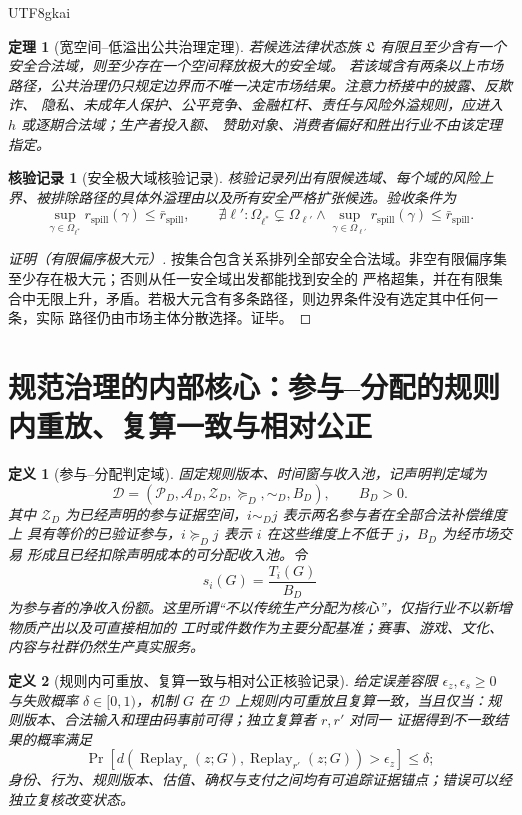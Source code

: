 \documentclass[12pt,a4paper,openany]{report}
\newtheorem{definition}{定义}[chapter]
\newtheorem{theorem}{定理}[chapter]
\newtheorem{Certificate}{核验记录}[chapter]
\newcommand{\Part}{\mathcal P}
\newcommand{\Act}{\mathcal A}
\begin{document}
\begin{CJK*}{UTF8}{gkai}
\begin{theorem}[宽空间--低溢出公共治理定理]
\label{thm:maximal-safe-governance-space}
若候选法律状态族 \(\mathfrak L\) 有限且至少含有一个安全合法域，则至少存在一个空间释放极大的安全域。
若该域含有两条以上市场路径，公共治理仍只规定边界而不唯一决定市场结果。注意力桥接中的披露、反欺诈、
隐私、未成年人保护、公平竞争、金融杠杆、责任与风险外溢规则，应进入 \(h\) 或逐期合法域；生产者投入额、
赞助对象、消费者偏好和胜出行业不由该定理指定。
\end{theorem}

\begin{Certificate}[安全极大域核验记录]
核验记录列出有限候选域、每个域的风险上界、被排除路径的具体外溢理由以及所有安全严格扩张候选。验收条件为
\[
  \sup_{\gamma\in\Omega_{\ell^*}}r_{\mathrm{spill}}(\gamma)
  \le\bar r_{\mathrm{spill}},
  \qquad
  \nexists\ell':
  \Omega_{\ell^*}\subsetneq\Omega_{\ell'}
  \wedge
  \sup_{\gamma\in\Omega_{\ell'}}r_{\mathrm{spill}}(\gamma)
  \le\bar r_{\mathrm{spill}}.
\]
\end{Certificate}

\begin{proof}[证明（有限偏序极大元）]
按集合包含关系排列全部安全合法域。非空有限偏序集至少存在极大元；否则从任一安全域出发都能找到安全的
严格超集，并在有限集合中无限上升，矛盾。若极大元含有多条路径，则边界条件没有选定其中任何一条，实际
路径仍由市场主体分散选择。证毕。
\end{proof}

\section{规范治理的内部核心：参与--分配的规则内重放、复算一致与相对公正}

\begin{definition}[参与--分配判定域]
固定规则版本、时间窗与收入池，记声明判定域为
\[
  \mathcal D=(\Part_D,\Act_D,\mathcal Z_D,\succeq_D,\sim_D,B_D),
  \qquad B_D>0.
\]
其中 \(\mathcal Z_D\) 为已经声明的参与证据空间，\(i\sim_D j\) 表示两名参与者在全部合法补偿维度上
具有等价的已验证参与，\(i\succeq_D j\) 表示 \(i\) 在这些维度上不低于 \(j\)，\(B_D\) 为经市场交易
形成且已经扣除声明成本的可分配收入池。令
\[
  s_i(G)=\frac{T_i(G)}{B_D}
\]
为参与者的净收入份额。这里所谓“不以传统生产分配为核心”，仅指行业不以新增物质产出以及可直接相加的
工时或件数作为主要分配基准；赛事、游戏、文化、内容与社群仍然生产真实服务。
\end{definition}

\begin{definition}[规则内可重放、复算一致与相对公正核验记录]
给定误差容限 \(\epsilon_z,\epsilon_s\ge0\) 与失败概率 \(\delta\in[0,1)\)，机制 \(G\) 在
\(\mathcal D\) 上规则内可重放且复算一致，当且仅当：规则版本、合法输入和理由码事前可得；独立复算者 \(r,r'\) 对同一
证据得到不一致结果的概率满足
\[
  \Pr\!\left[d\!\left(\operatorname{Replay}_r(z;G),
  \operatorname{Replay}_{r'}(z;G)\right)>\epsilon_z\right]\le\delta;
\]
身份、行为、规则版本、估值、确权与支付之间均有可追踪证据锚点；错误可以经独立复核改变状态。


\end{definition}
\end{CJK*}
\end{document}
